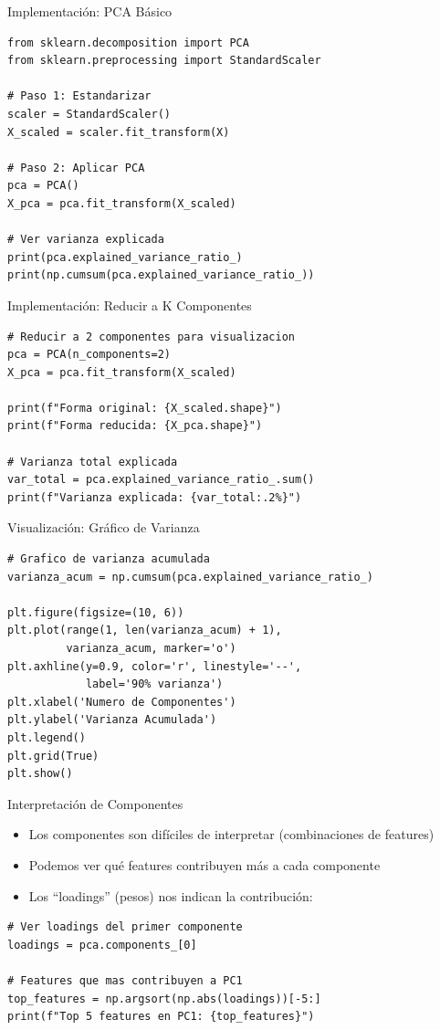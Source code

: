 \documentclass{beamer}
\begin{document}
\begin{frame}[fragile]{Implementación: PCA Básico}
    \begin{lstlisting}
from sklearn.decomposition import PCA
from sklearn.preprocessing import StandardScaler

# Paso 1: Estandarizar
scaler = StandardScaler()
X_scaled = scaler.fit_transform(X)

# Paso 2: Aplicar PCA
pca = PCA()
X_pca = pca.fit_transform(X_scaled)

# Ver varianza explicada
print(pca.explained_variance_ratio_)
print(np.cumsum(pca.explained_variance_ratio_))
    \end{lstlisting}
\end{frame}

\begin{frame}[fragile]{Implementación: Reducir a K Componentes}
    \begin{lstlisting}
# Reducir a 2 componentes para visualizacion
pca = PCA(n_components=2)
X_pca = pca.fit_transform(X_scaled)

print(f"Forma original: {X_scaled.shape}")
print(f"Forma reducida: {X_pca.shape}")

# Varianza total explicada
var_total = pca.explained_variance_ratio_.sum()
print(f"Varianza explicada: {var_total:.2%}")
    \end{lstlisting}
\end{frame}

\begin{frame}[fragile]{Visualización: Gráfico de Varianza}
    \begin{lstlisting}
# Grafico de varianza acumulada
varianza_acum = np.cumsum(pca.explained_variance_ratio_)

plt.figure(figsize=(10, 6))
plt.plot(range(1, len(varianza_acum) + 1),
         varianza_acum, marker='o')
plt.axhline(y=0.9, color='r', linestyle='--',
            label='90% varianza')
plt.xlabel('Numero de Componentes')
plt.ylabel('Varianza Acumulada')
plt.legend()
plt.grid(True)
plt.show()
    \end{lstlisting}
\end{frame}

\begin{frame}[fragile]{Interpretación de Componentes}
    \begin{itemize}
        \item Los componentes son difíciles de interpretar (combinaciones de features)
        \item Podemos ver qué features contribuyen más a cada componente
        \item Los ``loadings'' (pesos) nos indican la contribución:
    \end{itemize}
    \vspace{0.5em}
    \begin{lstlisting}
# Ver loadings del primer componente
loadings = pca.components_[0]

# Features que mas contribuyen a PC1
top_features = np.argsort(np.abs(loadings))[-5:]
print(f"Top 5 features en PC1: {top_features}")
    \end{lstlisting}
\end{frame}
\end{document}
